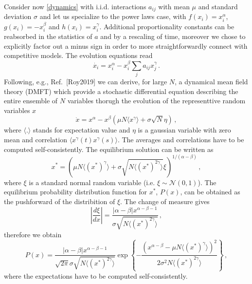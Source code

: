 \documentclass[%
 reprint,
 amsmath,amssymb,
 aps,
]{revtex4-2}
\begin{document}
Consider now \eqref{dynamics} with i.i.d. interactions $a_{ij}$ with mean $\mu$ and standard deviation $\sigma$
and let us specialize to the power laws case, with $f(x_i)=x_i^{\alpha}$, $g(x_i)=-x_i^{\beta}$ and $h(x_i)=x_i^{\gamma}$. 
Additional proportionality constants can be reabsorbed in the statistics of $a$ and by a rescaling of time, moreover we chose to explicitly factor out a minus sign in order to more straightforwardly connect with competitive models.
The evolution equations read
\begin{equation}
    \dot{x_i}=x_i^{\alpha} - x_i^{\beta}\sum_{j}a_{ij}x_j^{\gamma} \, .
\label{eq: full abg}
\end{equation}
Following, e.g., Ref.~[Roy2019] we can derive, for large $N$,
a dynamical mean field theory (DMFT) which provide a stochastic 
differential equation describing the entire ensemble of $N$ variables
thorugh the evolution of the representtive random variables $x$
\begin{equation}
    \dot{x} = x^{\alpha}-x^{\beta}\left( \mu N \langle x^{\gamma}\rangle + \sigma \sqrt{N} \eta\right) \, ,
\label{eq: dmft}
\end{equation}
where $\langle . \rangle$ stands for expectation value
and $\eta$ is a gaussian variable
with zero mean and correlation 
$\langle x^{\gamma}(t)x^{\gamma}(s)\rangle$. 
The averages and correlations have to be computed self-consistently.
The equilibrium solution can be written as
\begin{equation}
    x^* = \left( \mu N \langle (x^*)^{\gamma}\rangle + \sigma \sqrt{N\langle(x^*)^{2\gamma}\rangle}\xi\right)^{1/(\alpha-\beta)} \, ,
\end{equation}
where $\xi$ is a standard normal random variable (i.e. $\xi\sim\mathcal{N}(0,1)$).
The equilibrium probability distribution function for $x^*$, $P(x)$,
can be obtained as the pushforward of the distribition of $\xi$.
The change of measure gives
\begin{equation}
    \left|\frac{d \xi}{d x}\right|=\frac{|\alpha-\beta|x^{\alpha-\beta-1}}{\sigma \sqrt{N\langle(x^*)^{2\gamma}\rangle}} \, ,
\end{equation}
therefore we obtain
\begin{equation}
    P(x)=\frac{|\alpha-\beta|x^{\alpha-\beta-1}}{\sqrt{2\pi}\sigma \sqrt{N\langle(x^*)^{2\gamma}\rangle}}
    \exp{\left\{-\frac{(x^{\alpha-\beta}-\mu N\langle(x^*)^{\gamma}\rangle)^2}{2\sigma^2N\langle(x^*)^{2\gamma}\rangle}\right\}} \, ,
\end{equation}
where the expectations have to be computed self-consistently.
\end{document}
